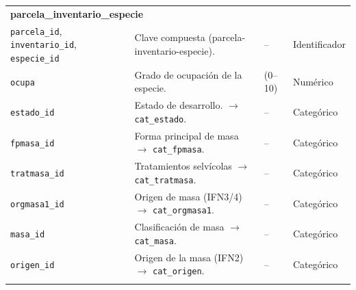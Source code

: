 \begin{longtable}{@{}p{2.8cm} p{6.8cm} p{2.2cm} p{2.2cm}@{}}
    \multicolumn{4}{l}{\textbf{parcela\_inventario\_especie}}                                                                                                                                      \\
    \texttt{parcela\_id}, \texttt{inventario\_id}, \texttt{especie\_id}    & Clave compuesta (parcela-inventario-especie).                  & --                           & Identificador         \\
    \texttt{ocupa}                                                         & Grado de ocupación de la especie.                              & (0--10)                      & Numérico              \\
    \texttt{estado\_id}                                                    & Estado de desarrollo. $\rightarrow$ \texttt{cat\_estado}.      & --                           & Categórico            \\
    \texttt{fpmasa\_id}                                                    & Forma principal de masa $\rightarrow$ \texttt{cat\_fpmasa}.    & --                           & Categórico            \\
    \texttt{tratmasa\_id}                                                  & Tratamientos selvícolas $\rightarrow$ \texttt{cat\_tratmasa}.  & --                           & Categórico            \\
    \texttt{orgmasa1\_id}                                                  & Origen de masa (IFN3/4)$\rightarrow$ \texttt{cat\_orgmasa1}.   & --                           & Categórico            \\
    \texttt{masa\_id}                                                      & Clasificación de masa $\rightarrow$ \texttt{cat\_masa}.        & --                           & Categórico            \\
    \texttt{origen\_id}                                                    & Origen de la masa (IFN2) $\rightarrow$ \texttt{cat\_origen}.   & --                           & Categórico            \\
    \addlinespace


\end{longtable}
